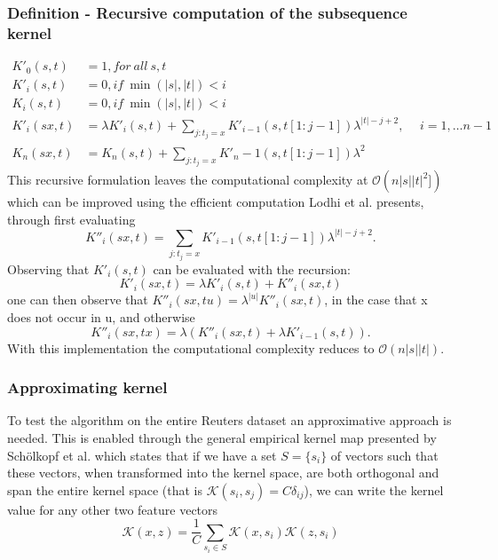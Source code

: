 \subsubsection{Definition - Recursive computation of the subsequence kernel}
\begin{align*}
	K'_{0}(s,t) & = 1, for\ all\ s,t \\
	K'_i(s,t) & = 0, if\ \min(|s|,|t|) < i \\
	K_i(s,t) & = 0, if\ \min(|s|,|t|) < i \\
	K'_i(sx,t) & = \lambda K'_i(s,t) + \sum_{j:t_j=x} K'_{i-1}(s,t[1:j-1])\lambda^{|t|-j+2}, \hspace{15pt} i = 1, \dots n-1 \\	
	K_{n}(sx,t) & = K_n(s,t) + \sum_{j:t_j = x}K'_n-1(s,t[1:j-1])\lambda^2
\end{align*}  
This recursive formulation leaves the computational complexity at $ \mathcal{O}(n|s||t|^2]) $ which can be improved using the efficient computation Lodhi et al. presents, through first evaluating
\begin{equation*}\label{key}
K''_i(sx,t) = \sum_{j:t_j = x}K'_{i-1}(s,t[1:j-1])\lambda^{|t|-j+2}.
\end{equation*}
Observing that $ K'_i(s,t) $ can be evaluated with the recursion:
\begin{equation*}\label{key}
K'_i(sx,t) = \lambda K'_i(s,t) + K''_i(sx,t)
\end{equation*}
one can then observe that $ K''_i(sx,tu) = \lambda^{|u|}K''_i(sx,t)$, in the case that x does not occur in u, and otherwise 
\begin{equation*}\label{key}
K''_i(sx,tx) = \lambda \left( K''_i(sx,t) + \lambda K'_{i-1}(s,t) \right).
\end{equation*} 
With this implementation the computational complexity reduces to $ \mathcal{O}(n|s||t|) $.



\subsubsection{Approximating kernel}
To test the algorithm on the entire Reuters dataset an approximative approach is needed. This is enabled through the general empirical kernel map presented by Schölkopf et al. which states that if we have a set $ S = \{s_i\} $ of vectors such that these vectors, when transformed into the kernel space, are both orthogonal and span the entire kernel space (that is $ \mathcal{K}(s_i,s_j) = C\delta_{ij} $), we can write the kernel value for any other two feature vectors
\begin{equation}\label{eq:kernel_approx}
\mathcal{K}(x,z) = \dfrac{1}{C}\sum_{s_i \in S}\mathcal{K}(x,s_i)\mathcal{K}(z,s_i)
\end{equation}

